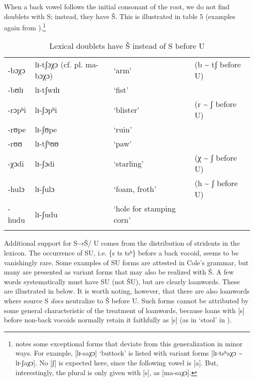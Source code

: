 When a back vowel follows the initial consonant of the root, we do not find doublets with S; instead, they have Š. This is illustrated in table 5 (examples again from \citealt{Cole1955}).\footnote{\citet[83]{Cole1955} notes some exceptional forms that deviate from this generalization in minor ways. For example, [lɪ-saχɔ] ‘buttock’ is listed with variant forms [lɪ-tsʰaχɔ {\textasciitilde} lɪ-ʃaχɔ]. No [ʃ] is expected here, since the following vowel is [a]. But, interestingly, the plural is only given with [s], as [ma-saχɔ].}
\begin{table}
\begin{tabularx}{\textwidth}{lllX}
\lsptoprule

-bɔχɔ & lɪ-tʃɔχɔ
(cf. pl. ma-bɔχɔ) & ‘arm’ & (b {\textasciitilde} tʃ before U)\\
-bʊlɪ & lɪ-tʃwɪlɪ & ‘fist’ & \\
-rɔpʰi & lɪ-ʃɔpʰi & ‘blister’ & (r {\textasciitilde} ʃ before U)\\
-rʊpe & lɪ-ʃʊpe & ‘ruin’ & \\
-rʊʊ & lɪ-tʃʰʊʊ & ‘paw’ & \\
-χɔdi & lɪ-ʃɔdi & ‘starling’ & (χ {\textasciitilde} ʃ before U)\\
-hulɔ & lɪ-ʃulɔ & ‘foam, froth’ & (h {\textasciitilde} ʃ before U)\\
-hudu & lɪ-ʃudu & ‘hole for stamping corn’ & \\
\lspbottomrule
\end{tabularx}
\caption{Lexical doublets have Š instead of S before U}
\label{tab:bennett:5}
\end{table}

Additional support for S→Š/ {\longrule} U comes from the distribution of stridents in the lexicon. The occurrence of SU, i.e. \{s ts tsʰ\} before a back vocoid, seems to be vanishingly rare. Some examples of SU forms are attested in Cole’s grammar, but many are presented as variant forms that may also be realized with Š. A few words systematically must have SU (not ŠU), but are clearly loanwords. These are illustrated in  below. It is worth noting, however, that there are also loanwords where source S \textit{does} neutralize to Š before U. Such forms cannot be attributed by some general characteristic of the treatment of loanwords, because loans with [s] before non-back vocoids normally retain it faithfully as [s] (as in ‘stool’ in ).

